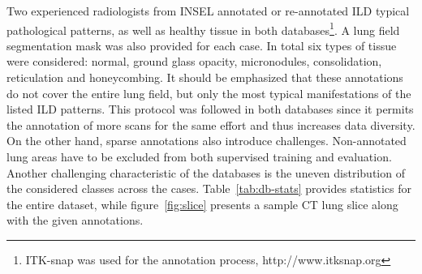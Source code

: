 \documentclass[journal]{IEEEtran}
\begin{document}
Two experienced radiologists from INSEL annotated or re-annotated ILD typical pathological patterns, as well as healthy tissue in both databases\footnote{ITK-snap was used for the annotation process, http://www.itksnap.org}. A lung field segmentation mask was also provided for each case. In total six types of tissue were considered: normal, ground glass opacity, micronodules, consolidation, reticulation and honeycombing. It should be emphasized that these annotations do not cover the entire lung field, but only the most typical manifestations of the listed ILD patterns. This protocol was followed in both databases since it permits the annotation of more scans for the same effort and thus increases data diversity. On the other hand, sparse annotations also introduce challenges. Non-annotated lung areas have to be excluded from both supervised training and evaluation. Another challenging characteristic of the databases is the uneven distribution of the considered classes across the cases. Table~\ref{tab:db-stats} provides statistics for the entire dataset, while figure~\ref{fig:slice} presents a sample CT lung slice along with the given annotations.
\end{document}
